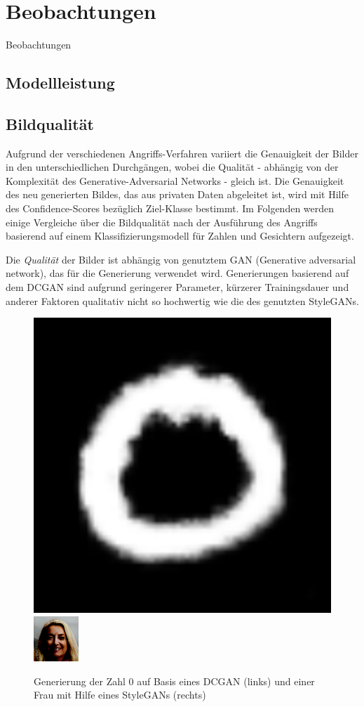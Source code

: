 \section{Beobachtungen} \label{chpt:Ergebnisse_Beobachtungen}
Beobachtungen
\subsection{Modellleistung}

\subsection{Bildqualität}
Aufgrund der verschiedenen Angriffs-Verfahren variiert die Genauigkeit der Bilder in den unterschiedlichen Durchgängen, wobei die Qualität - abhängig von der Komplexität des Generative-Adversarial Networks - gleich ist. Die Genauigkeit des neu generierten Bildes, das aus privaten Daten abgeleitet ist, wird mit Hilfe des Confidence-Scores bezüglich Ziel-Klasse bestimmt. Im Folgenden werden einige Vergleiche über die Bildqualität nach der Ausführung des Angriffs basierend auf einem Klassifizierungsmodell für Zahlen und Gesichtern aufgezeigt.

Die \textit{Qualität} der Bilder ist abhängig von genutztem GAN (Generative adversarial network), das für die Generierung verwendet wird. Generierungen basierend auf dem DCGAN sind aufgrund geringerer Parameter, kürzerer Trainingsdauer und anderer Faktoren qualitativ nicht so hochwertig wie die des genutzten StyleGANs.

\begin{figure}[H]
	\centering
	
	\includegraphics[width=0.35\linewidth]{Bilder/0_mnist.png}
	\hspace{1cm} %
	\includegraphics[width=0.35\linewidth]{Bilder/401_celeba.png}
	
	\caption{Generierung der Zahl 0 auf Basis eines DCGAN (links) und einer Frau mit Hilfe eines StyleGANs (rechts)}
	\label{img:gen_img}
\end{figure}

